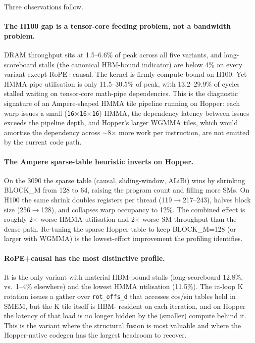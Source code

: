 Three observations follow.

\paragraph{The H100 gap is a tensor-core feeding problem, not a
bandwidth problem.} DRAM throughput sits at 1.5--6.6\% of peak across
all five variants, and long-scoreboard stalls (the canonical HBM-bound
indicator) are below 4\% on every variant except RoPE+causal. The
kernel is firmly compute-bound on H100. Yet HMMA pipe utilisation is
only 11.5--30.5\% of peak, with 13.2--29.9\% of cycles stalled waiting
on tensor-core math-pipe dependencies. This is the diagnostic
signature of an Ampere-shaped HMMA tile pipeline running on Hopper:
each warp issues a small (\texttt{16$\times$16$\times$16}) HMMA, the
dependency latency between issues exceeds the pipeline depth, and
Hopper's larger WGMMA tiles, which would amortise the dependency
across $\sim$8$\times$ more work per instruction, are not emitted by
the current code path.

\paragraph{The Ampere sparse-table heuristic inverts on Hopper.} On
the 3090 the sparse table (causal, sliding-window, ALiBi) wins by
shrinking BLOCK\_M from 128 to 64, raising the program count and
filling more SMs. On H100 the same shrink doubles registers per
thread (119$\to$217--243), halves block size (256$\to$128), and
collapses warp occupancy to 12\%. The combined effect is roughly
2$\times$ worse HMMA utilisation and 2$\times$ worse SM throughput
than the dense path. Re-tuning the sparse Hopper table to keep
BLOCK\_M=128 (or larger with WGMMA) is the lowest-effort improvement
the profiling identifies.

\paragraph{RoPE+causal has the most distinctive profile.} It is the
only variant with material HBM-bound stalls (long-scoreboard 12.8\%,
vs.\ 1--4\% elsewhere) and the lowest HMMA utilisation (11.5\%). The
in-loop K rotation issues a gather over \texttt{rot\_offs\_d} that
accesses cos/sin tables held in SMEM, but the K tile itself is HBM-
resident on each iteration, and on Hopper the latency of that load is
no longer hidden by the (smaller) compute behind it. This is the
variant where the structural fusion is most valuable and where the
Hopper-native codegen has the largest headroom to recover.


